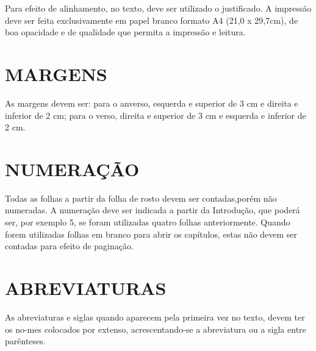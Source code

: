 Para efeito de alinhamento, no texto, deve ser utilizado o justificado. A impressão deve ser feita exclusivamente em papel branco formato A4 (21,0 x 29,7cm), de boa opacidade e de qualidade que permita a impressão e leitura.

\section{MARGENS}

As margens devem ser: para o anverso, esquerda e superior de 3 cm e direita e inferior de 2 cm; para o verso, direita e superior de 3 cm e esquerda e inferior de 2 cm.

\section{NUMERAÇÃO}

Todas as folhas a partir da folha de rosto devem ser contadas,porém não numeradas. A numeração deve ser indicada a partir da Introdução, que poderá ser, por exemplo 5, se foram utilizadas quatro folhas anteriormente. Quando forem utilizadas folhas em branco para abrir os capítulos, estas não devem ser contadas para efeito de paginação.

\section{ABREVIATURAS}

As abreviaturas e siglas quando aparecem pela primeira vez no texto, devem ter os no-mes colocados por extenso, acrescentando-se a abreviatura ou a sigla entre parênteses.


